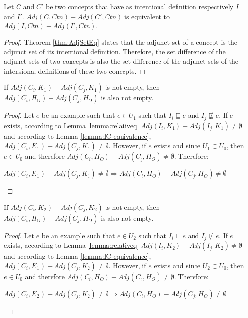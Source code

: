 \begin{lemma}\label{lemma:IC equivalence}
Let $C$ and $C'$ be two concepts that have as intentional definition respectively $I$ and $I'$. $Adj(C, Ctn) - Adj(C', Ctn)$ is equivalent to $Adj(I, Ctn) - Adj(I', Ctn)$.
\end{lemma}

\begin{proof}
Theorem \ref{thm:AdjSetEq} states that the adjunct set of a concept is the adjunct set of its intentional definition. Therefore, the set difference of the adjunct sets of two concepts is also the set difference of the adjunct sets of the intensional definitions of these two concepts.
\end{proof}

\begin{lemma}\label{lemma:sd11}
If $Adj(C_{i}, K_{1}) - Adj(C_{j}, K_{1})$ is not  empty, then $Adj(C_{i}, H_{O}) - Adj(C_{j}, H_{O})$ is also not empty.
\end{lemma}

\begin{proof}
Let $e$ be an example such that $e \in U_{1}$ such that $I_{i} \sqsubseteq e$ and $I_{j} \not \sqsubseteq e$. If $e$ exists, according to Lemma \ref{lemma:relativeq} $Adj(I_{i}, K_{1}) - Adj(I_{j}, K_{1}) \neq \emptyset$ and according to Lemma \ref{lemma:IC equivalence}, $Adj(C_{i}, K_{1}) - Adj(C_{j}, K_{1}) \neq \emptyset$. However, if $e$ exists and since $U_{1} \subset U_{0}$, then $e \in U_{0}$ and therefore $Adj(C_{i}, H_{O}) - Adj(C_{j}, H_{O}) \neq \emptyset$. Therefore:

\begin{center}
$Adj(C_{i}, K_{1}) - Adj(C_{j}, K_{1}) \neq \emptyset \Rightarrow Adj(C_{i}, H_{O}) - Adj(C_{j}, H_{O}) \neq \emptyset$
\end{center}
\end{proof}

\begin{lemma}\label{lemma:sd12}
If $Adj(C_{i}, K_{2}) - Adj(C_{j}, K_{2})$ is not empty, then $Adj(C_{i}, H_{O}) - Adj(C_{j}, H_{O})$ is also not empty.
\end{lemma}

\begin{proof}
Let $e$ be an example such that $e \in U_{2}$ such that $I_{i} \sqsubseteq e$ and $I_{j} \not \sqsubseteq e$. If $e$ exists, according to Lemma \ref{lemma:relativeq} $Adj(I_{i}, K_{2}) - Adj(I_{j}, K_{2}) \neq \emptyset$ and according to Lemma \ref{lemma:IC equivalence}, $Adj(C_{i}, K_{1}) - Adj(C_{j}, K_{2}) \neq \emptyset$. However, if $e$ exists and since $U_{2} \subset U_{0}$, then $e \in U_{0}$ and therefore $Adj(C_{i}, H_{O}) - Adj(C_{j}, H_{O}) \neq \emptyset$. Therefore:

\begin{center}
$Adj(C_{i}, K_{2}) - Adj(C_{j}, K_{2}) \neq \emptyset \Rightarrow Adj(C_{i}, H_{O}) - Adj(C_{j}, H_{O}) \neq \emptyset$
\end{center}
\end{proof}

